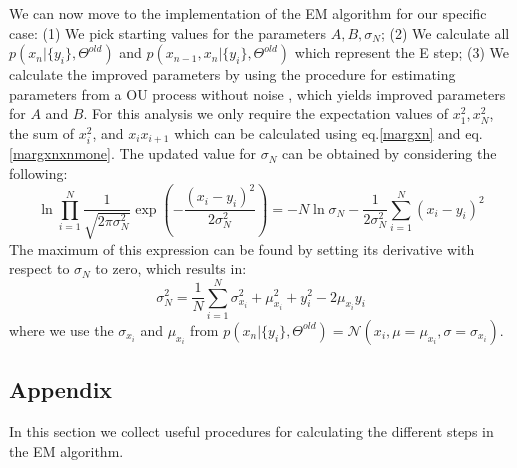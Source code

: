 \documentclass[%
 reprint,
 amsmath,amssymb,
 aps,
]{revtex4-1}
\begin{document}
We can now move to the implementation of the EM algorithm for our specific case: (1) We pick starting values for the parameters ${A,B,\sigma_N}$; (2) We calculate all $p\left( x_{n}|\{y_{i}\},\Theta^{old}\right)$ and $p\left( x_{n-1},x_{n}|\{y_{i}\},\Theta^{old}\right)$ which represent the E step; (3) We calculate the improved parameters by using the procedure for estimating parameters from a OU process without noise \cite{PRE}, which yields improved parameters for $A$ and $B$.  For this analysis we only require the expectation values of $x_{1}^{2},x_{N}^2$, the sum of $x_{i}^2$, and $x_{i}x_{i+1}$ which can be calculated using eq.\ref{margxn} and eq.\ref{margxnxnmone}.  The updated value for $\sigma_{N}$ can be obtained by considering the following:
\begin{equation}
	\ln \prod_{i=1}^{N}\frac{1}{\sqrt{2\pi\sigma_{N}^{2}}}\exp\left(-\frac{(x_{i}-y_{i})^2}{2\sigma_{N}^{2}}\right)=-N\ln\sigma_{N}-\frac{1}{2\sigma_{N}^2}\sum_{i=1}^{N}(x_{i}-y_{i})^2
\end{equation}
The maximum of this expression can be found by setting its derivative with respect to $\sigma_N$ to zero, which results in:
\begin{equation}
	\sigma_{N}^{2} = \frac{1}{N}\sum_{i=1}^{N}\sigma_{x_{i}}^{2}+\mu_{x_{i}}^{2}+y_{i}^{2}-2\mu_{x_{i}}y_{i}
\end{equation}
where we use the $\sigma_{x_{i}}$ and $\mu_{x_{i}}$ from $p\left( x_{n}|\{y_{i}\},\Theta^{old}\right)=\mathcal{N}(x_{i},\mu=\mu_{x_{i}},\sigma=\sigma_{x_{i}})$.
\subsection{Appendix}
In this section we collect useful procedures for calculating the different steps in the EM algorithm.
\end{document}
